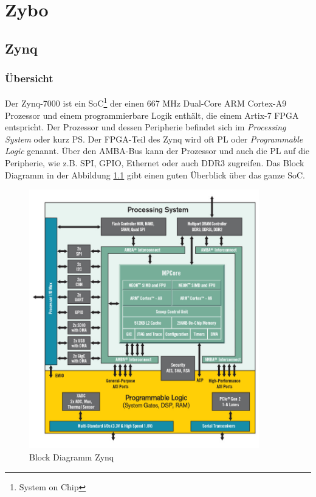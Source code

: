 \chapter{Zybo}
\section{Zynq}
\subsection{Übersicht}
Der Zynq-7000 ist ein SoC\footnote{System on Chip} der einen 667 MHz Dual-Core ARM Cortex-A9 Prozessor und einem programmierbare Logik enthält, die einem Artix-7 FPGA entspricht.
Der Prozessor und dessen Peripherie befindet sich im \textit{Processing System} oder kurz PS.
Der FPGA-Teil des Zynq wird oft PL oder \textit{Programmable Logic} genannt.
Über den AMBA-Bus kann der Prozessor und auch die PL auf die Peripherie, wie z.B. SPI, GPIO, Ethernet oder auch DDR3 zugreifen.
Das Block Diagramm in der Abbildung \ref{fig:BlockDiagrammZynq} gibt einen guten Überblick über das ganze SoC.

\begin{figure}[htbp]
	\centering
		\includegraphics[width=10cm,height=\textheight,keepaspectratio]{images/zynqBlockDiagram.png}
	\caption[Block Diagramm Zynq]{Block Diagramm Zynq\footnotemark}
	\label{fig:BlockDiagrammZynq}
\end{figure}


